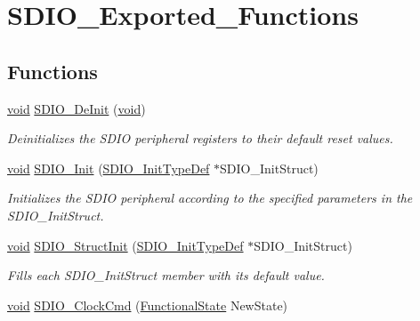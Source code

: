 \hypertarget{group___s_d_i_o___exported___functions}{}\section{S\+D\+I\+O\+\_\+\+Exported\+\_\+\+Functions}
\label{group___s_d_i_o___exported___functions}
\subsection*{Functions}
\begin{DoxyCompactItemize}
\item 
\hyperlink{usb__devapi_8h_afabf60e7f57651d6d595a02c75f07cd0}{void} \hyperlink{group___s_d_i_o___exported___functions_gac359d2c6c67a2590f8f9b720c0e4ff1b}{S\+D\+I\+O\+\_\+\+De\+Init} (\hyperlink{usb__devapi_8h_afabf60e7f57651d6d595a02c75f07cd0}{void})
\begin{DoxyCompactList}\small\item\em Deinitializes the S\+D\+IO peripheral registers to their default reset values. \end{DoxyCompactList}\item 
\hyperlink{usb__devapi_8h_afabf60e7f57651d6d595a02c75f07cd0}{void} \hyperlink{group___s_d_i_o___exported___functions_gad40764a8e37c0ed5c9141ae338ff0203}{S\+D\+I\+O\+\_\+\+Init} (\hyperlink{struct_s_d_i_o___init_type_def}{S\+D\+I\+O\+\_\+\+Init\+Type\+Def} $\ast$S\+D\+I\+O\+\_\+\+Init\+Struct)
\begin{DoxyCompactList}\small\item\em Initializes the S\+D\+IO peripheral according to the specified parameters in the S\+D\+I\+O\+\_\+\+Init\+Struct. \end{DoxyCompactList}\item 
\hyperlink{usb__devapi_8h_afabf60e7f57651d6d595a02c75f07cd0}{void} \hyperlink{group___s_d_i_o___exported___functions_ga778d338c29df4fae9ef69432e6df32ad}{S\+D\+I\+O\+\_\+\+Struct\+Init} (\hyperlink{struct_s_d_i_o___init_type_def}{S\+D\+I\+O\+\_\+\+Init\+Type\+Def} $\ast$S\+D\+I\+O\+\_\+\+Init\+Struct)
\begin{DoxyCompactList}\small\item\em Fills each S\+D\+I\+O\+\_\+\+Init\+Struct member with its default value. \end{DoxyCompactList}\item 
\hyperlink{usb__devapi_8h_afabf60e7f57651d6d595a02c75f07cd0}{void} \hyperlink{group___s_d_i_o___exported___functions_ga7243b857d6b323748ff3a493b265bedc}{S\+D\+I\+O\+\_\+\+Clock\+Cmd} (\hyperlink{agilefox_2library_2inc_2stm32f10x__type_8h_ac9a7e9a35d2513ec15c3b537aaa4fba1}{Functional\+State} New\+State)

\end{DoxyCompactItemize}
